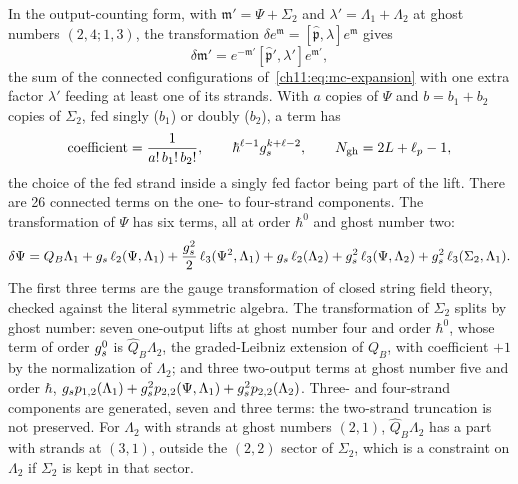\noindent{}
In the output-counting form, with $\mathfrak{m}' = \Psi + \Sigma_2$ and $\lambda' = \Lambda_1 + \Lambda_2$ at ghost numbers $(2, 4; 1, 3)$, the transformation $\delta e^{\mathfrak{m}} = [\hat{\mathfrak{p}}, \lambda] e^{\mathfrak{m}}$ gives
\begin{equation}
  \delta \mathfrak{m}'
    = e^{- \mathfrak{m}'} [\hat{\mathfrak{p}}', \lambda'] e^{\mathfrak{m}'},
\end{equation}
the sum of the connected configurations of~\eqref{ch11:eq:mc-expansion} with one extra factor $\lambda'$ feeding at least one of its strands.
With $a$ copies of $\Psi$ and $b = b_1 + b_2$ copies of $\Sigma_2$, fed singly ($b_1$) or doubly ($b_2$), a term has
\begin{equation}
  \text{coefficient}
    = \frac{1}{a! \, b_1! \, b_2!},
  \qquad
  \hbar^{\ell - 1} g_s^{k + \ell - 2},
  \qquad
  N_{\text{gh}}
    = 2 L + \ell_p - 1,
\end{equation}
the choice of the fed strand inside a singly fed factor being part of the lift.
There are 26 connected terms on the one- to four-strand components.
The transformation of $\Psi$ has six terms, all at order $\hbar^0$ and ghost number two:
\begin{equation}
  \delta \Psi
    = Q_B \Lambda_1 + g_s \, \ell_2(\Psi, \Lambda_1) + \frac{g_s^2}{2} \, \ell_3(\Psi^2, \Lambda_1) + g_s \, \ell_2(\Lambda_2) + g_s^2 \, \ell_3(\Psi, \Lambda_2) + g_s^2 \, \ell_3(\Sigma_2, \Lambda_1).
\end{equation}
The first three terms are the gauge transformation of closed string field theory, checked against the literal symmetric algebra.
The transformation of $\Sigma_2$ splits by ghost number: seven one-output lifts at ghost number four and order $\hbar^0$, whose term of order $g_s^0$ is $\hat{Q}_B \Lambda_2$, the graded-Leibniz extension of $Q_B$, with coefficient $+ 1$ by the normalization of $\Lambda_2$; and three two-output terms at ghost number five and order $\hbar$, $g_s p_{1,2}(\Lambda_1) + g_s^2 p_{2,2}(\Psi, \Lambda_1) + g_s^2 p_{2,2}(\Lambda_2)$.
Three- and four-strand components are generated, seven and three terms: the two-strand truncation is not preserved.
For $\Lambda_2$ with strands at ghost numbers $(2, 1)$, $\hat{Q}_B \Lambda_2$ has a part with strands at $(3, 1)$, outside the $(2, 2)$ sector of $\Sigma_2$, which is a constraint on $\Lambda_2$ if $\Sigma_2$ is kept in that sector.

